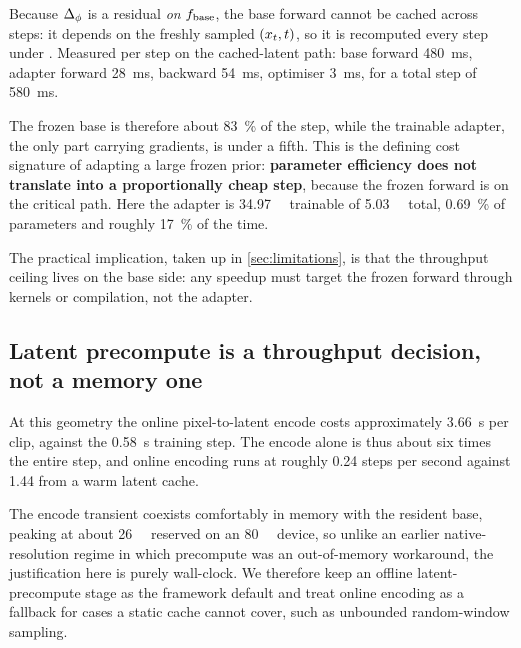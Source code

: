Because $\Delta_{\phi}$ is a residual \emph{on} $f_{\mathrm{base}}$, the base forward cannot
be cached across steps: it depends on the freshly sampled $(x_t, t)$, so it
is recomputed every step under . Measured per step on the
cached-latent path: base forward \SI{480}{\milli\second}, adapter forward
\SI{28}{\milli\second}, backward \SI{54}{\milli\second}, optimiser
\SI{3}{\milli\second}, for a total step of
\SI{580}{\milli\second}.

The frozen base is therefore about \SI{83}{\percent} of the step, while the
trainable adapter, the only part carrying gradients, is under a fifth. This
is the defining cost signature of adapting a large frozen prior:
\textbf{parameter efficiency does not translate into a proportionally cheap
step}, because the frozen forward is on the critical path. Here the adapter
is \SI{34.97}{\mega\nothing} trainable of \SI{5.03}{\giga\nothing} total,
\SI{0.69}{\percent} of parameters and roughly \SI{17}{\percent} of the time.

The practical implication, taken up in \cref{sec:limitations}, is that the
throughput ceiling lives on the base side: any speedup must target the
frozen forward through kernels or compilation, not the adapter.

\subsection{Latent precompute is a throughput decision, not a memory one}

At this geometry the online pixel-to-latent encode costs approximately
\SI{3.66}{\second} per clip, against the \SI{0.58}{\second} training
step. The encode alone is thus about
six times the entire step, and online encoding runs at roughly
\num{0.24} steps per second against \num{1.44} from a warm latent cache.

The encode transient coexists comfortably in memory with the resident base,
peaking at about \SI{26}{\giga\byte} reserved on an \SI{80}{\giga\byte}
device, so unlike an earlier native-resolution regime in which precompute
was an out-of-memory workaround, the justification here is purely
wall-clock. We therefore keep an offline latent-precompute stage as the
framework default and treat online encoding as a fallback for cases a static
cache cannot cover, such as unbounded random-window sampling.
